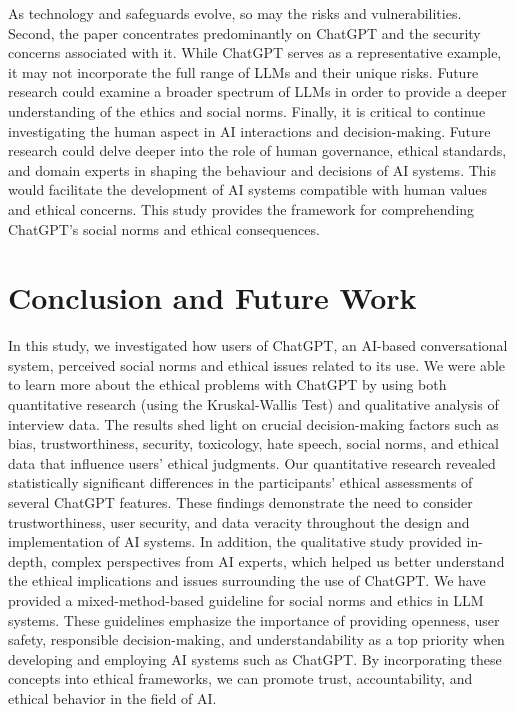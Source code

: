 \documentclass[sigconf]{acmart}
\begin{document}
As technology and safeguards evolve, so may the risks and vulnerabilities. Second, the paper concentrates predominantly on ChatGPT and the security concerns associated with it. While ChatGPT serves as a representative example, it may not incorporate the full range of LLMs and their unique risks. Future research could examine a broader spectrum of LLMs in order to provide a deeper understanding of the ethics and social norms. Finally, it is critical to continue investigating the human aspect in AI interactions and decision-making. Future research could delve deeper into the role of human governance, ethical standards, and domain experts in shaping the behaviour and decisions of AI systems. This would facilitate the development of AI systems compatible with human values and ethical concerns. This study provides the framework for comprehending ChatGPT's social norms and ethical consequences. 


\section{Conclusion and Future Work}


In this study, we investigated how users of ChatGPT, an AI-based conversational system, perceived social norms and ethical issues related to its use. We were able to learn more about the ethical problems with ChatGPT by using both quantitative research (using the Kruskal-Wallis Test) and qualitative analysis of interview data. The results shed light on crucial decision-making factors such as bias, trustworthiness, security, toxicology, hate speech, social norms, and ethical data that influence users' ethical judgments. Our quantitative research revealed statistically significant differences in the participants' ethical assessments of several ChatGPT features. These findings demonstrate the need to consider trustworthiness, user security, and data veracity throughout the design and implementation of AI systems. In addition, the qualitative study provided in-depth, complex perspectives from AI experts, which helped us better understand the ethical implications and issues surrounding the use of ChatGPT. We have provided a mixed-method-based guideline for social norms and ethics in LLM systems. These guidelines emphasize the importance of providing openness, user safety, responsible decision-making, and understandability as a top priority when developing and employing AI systems such as ChatGPT. By incorporating these concepts into ethical frameworks, we can promote trust, accountability, and ethical behavior in the field of AI.
\end{document}
